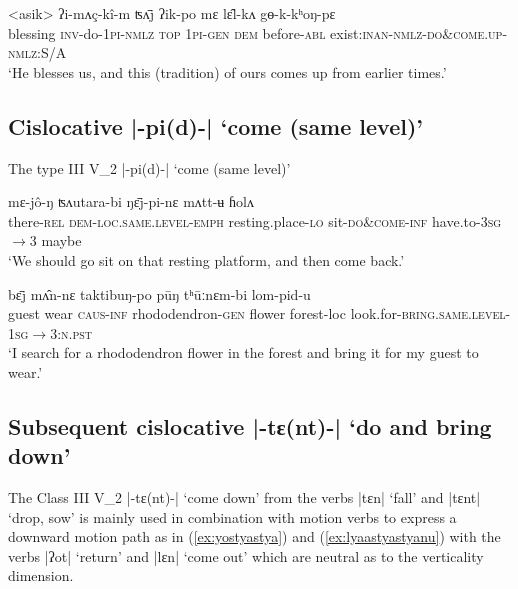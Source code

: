 \documentclass[oneside,a4paper,11pt]{article}
\newcommand{\ipa}[1]{{\phon#1}}
\newcommand{\dhatu}[2]{|\ipa{#1}| `#2'}
\begin{document}
\begin{exe}
\ex \label{ex:gyokkhongpya}
 \gll <asik> \ipa{ʔi-mʌç-kî-m} \ipa{ʦʌ̄j} \ipa{ʔik-po} \ipa{mɛ} \ipa{lɛ̂l-kʌ} \ipa{gɵ-k-kʰoŋ-pɛ} \\
blessing \textsc{inv}-do-\textsc{1pi}-\textsc{nmlz} \textsc{top} \textsc{1pi}-\textsc{gen} \textsc{dem} before-\textsc{abl} exist:\textsc{inan}-\textsc{nmlz}-\textsc{do\&come.up}-\textsc{nmlz}:S/A \\
\glt   `He blesses us, and this (tradition) of ours comes up from earlier times.'
\end{exe}

 

\subsection{Cislocative \dhatu{-pi(d)-}{come (same level)}} \label{sec:v2.pi}
The type III V_2 \dhatu{-pi(d)-}{come (same level)} 

\begin{exe}
\ex \label{ex:ngyaipinya}
 \gll \ipa{jakâ-m}	\ipa{mɛ-jô-ŋ}	\ipa{ʦʌutara-bi}	\ipa{ŋɛ̄j-pi-nɛ}	\ipa{mʌtt-ʉ}	\ipa{ɦolʌ} \\
 there-\textsc{rel} \textsc{dem-loc.same.level}-\textsc{emph} resting.place-\textsc{lo} sit-\textsc{do\&come}-\textsc{inf} have.to-\textsc{3sg$\rightarrow$3} maybe \\
 \glt `We should go sit on that resting platform, and then come back.'
 \end{exe}
 
\begin{exe}
\ex \label{ex:lompidu}
 \gll \ipa{tsʰɛ̂l}	\ipa{bɛ̄j}	\ipa{mʌ̂n-nɛ}	\ipa{taktibuŋ-po}	\ipa{pūŋ}	\ipa{tʰūːnɛm-bi}	\ipa{lom-pid-u} \\
 guest wear \textsc{caus}-\textsc{inf} rhododendron-\textsc{gen} flower forest-loc look.for-\textsc{bring.same.level}-\textsc{1sg$\rightarrow$3:n.pst} \\
\glt `I search for a rhododendron flower in the forest and bring it for my guest to wear.'
\end{exe}

\subsection{Subsequent cislocative \dhatu{-tɛ(nt)-}{do and bring down}} \label{sec:v2.tya}
The Class III V_2 \dhatu{-tɛ(nt)-}{come down} from the verbs \dhatu{tɛn}{fall} and \dhatu{tɛnt}{drop, sow} is mainly used in combination with motion verbs to express a downward motion path as in (\ref{ex:yostyastya}) and (\ref{ex:lyaastyastyanu}) with the verbs \dhatu{ʔot}{return} and \dhatu{lɛn}{come out} which are neutral as to the verticality dimension.
\end{document}
